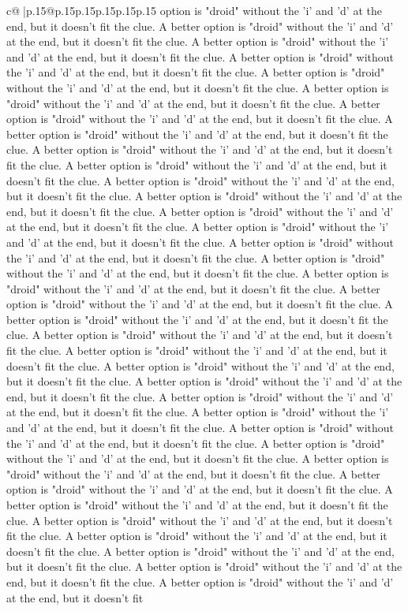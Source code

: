 \documentclass{article}
\begin{document}
{\begin{supertabular}{c@{$\;$}|p{.15\linewidth}@{}p{.15\linewidth}p{.15\linewidth}p{.15\linewidth}p{.15\linewidth}p{.15\linewidth}}
{{{option is "droid" without the 'i' and 'd' at the end, but it doesn't fit the clue. A better option is "droid" without the 'i' and 'd' at the end, but it doesn't fit the clue. A better option is "droid" without the 'i' and 'd' at the end, but it doesn't fit the clue. A better option is "droid" without the 'i' and 'd' at the end, but it doesn't fit the clue. A better option is "droid" without the 'i' and 'd' at the end, but it doesn't fit the clue. A better option is "droid" without the 'i' and 'd' at the end, but it doesn't fit the clue. A better option is "droid" without the 'i' and 'd' at the end, but it doesn't fit the clue. A better option is "droid" without the 'i' and 'd' at the end, but it doesn't fit the clue. A better option is "droid" without the 'i' and 'd' at the end, but it doesn't fit the clue. A better option is "droid" without the 'i' and 'd' at the end, but it doesn't fit the clue. A better option is "droid" without the 'i' and 'd' at the end, but it doesn't fit the clue. A better option is "droid" without the 'i' and 'd' at the end, but it doesn't fit the clue. A better option is "droid" without the 'i' and 'd' at the end, but it doesn't fit the clue. A better option is "droid" without the 'i' and 'd' at the end, but it doesn't fit the clue. A better option is "droid" without the 'i' and 'd' at the end, but it doesn't fit the clue. A better option is "droid" without the 'i' and 'd' at the end, but it doesn't fit the clue. A better option is "droid" without the 'i' and 'd' at the end, but it doesn't fit the clue. A better option is "droid" without the 'i' and 'd' at the end, but it doesn't fit the clue. A better option is "droid" without the 'i' and 'd' at the end, but it doesn't fit the clue. A better option is "droid" without the 'i' and 'd' at the end, but it doesn't fit the clue. A better option is "droid" without the 'i' and 'd' at the end, but it doesn't fit the clue. A better option is "droid" without the 'i' and 'd' at the end, but it doesn't fit the clue. A better option is "droid" without the 'i' and 'd' at the end, but it doesn't fit the clue. A better option is "droid" without the 'i' and 'd' at the end, but it doesn't fit the clue. A better option is "droid" without the 'i' and 'd' at the end, but it doesn't fit the clue. A better option is "droid" without the 'i' and 'd' at the end, but it doesn't fit the clue. A better option is "droid" without the 'i' and 'd' at the end, but it doesn't fit the clue. A better option is "droid" without the 'i' and 'd' at the end, but it doesn't fit the clue. A better option is "droid" without the 'i' and 'd' at the end, but it doesn't fit the clue. A better option is "droid" without the 'i' and 'd' at the end, but it doesn't fit the clue. A better option is "droid" without the 'i' and 'd' at the end, but it doesn't fit the clue. A better option is "droid" without the 'i' and 'd' at the end, but it doesn't fit the clue. A better option is "droid" without the 'i' and 'd' at the end, but it doesn't fit the clue. A better option is "droid" without the 'i' and 'd' at the end, but it doesn't fit the clue. A better option is "droid" without the 'i' and 'd' at the end, but it doesn't fit }}}
\end{supertabular}}
\end{document}
